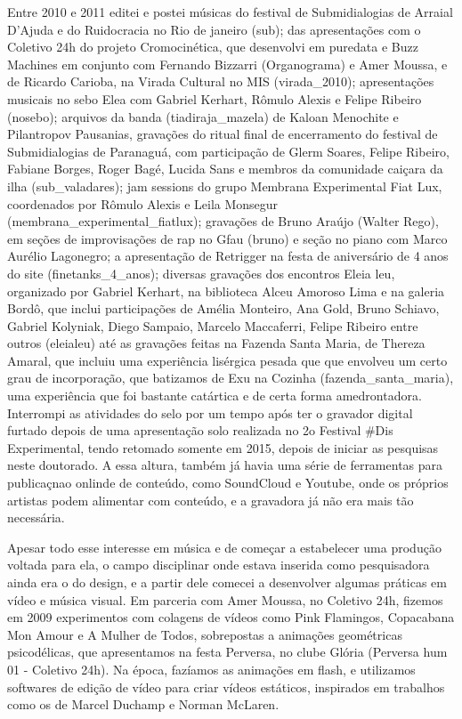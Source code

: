 Entre 2010 e 2011 editei e postei músicas do festival de Submidialogias de Arraial D'Ajuda e do Ruidocracia no Rio de janeiro (\/sub\/); das apresentações com o Coletivo 24h do projeto Cromocinética, que desenvolvi em puredata e Buzz Machines em conjunto com Fernando Bizzarri (Organograma) e Amer Moussa, e de Ricardo Carioba, na Virada Cultural no MIS (virada\_2010\/); apresentações musicais no sebo Elea com Gabriel Kerhart, Rômulo Alexis e Felipe Ribeiro (nosebo\/); arquivos da banda (tiadiraja\_mazela\/) de Kaloan Menochite e Pilantropov Pausanias, gravações do ritual final de encerramento do festival de Submidialogias de Paranaguá, com participação de Glerm Soares, Felipe Ribeiro, Fabiane Borges, Roger Bagé, Lucida Sans e membros da comunidade caiçara da ilha (\/sub\_valadares\/); jam sessions do grupo Membrana Experimental Fiat Lux, coordenados por Rômulo Alexis e Leila Monsegur (membrana\_experimental\_fiatlux\/); gravações de Bruno Araújo (Walter Rego), em seções de improvisações de rap no Gfau (bruno\/) e seção no piano com Marco Aurélio Lagonegro; a apresentação de Retrigger na festa de aniversário de 4 anos do site (finetanks\_4\_anos\/); diversas gravações dos encontros Eleia leu, organizado por Gabriel Kerhart, na biblioteca Alceu Amoroso Lima e na galeria Bordô, que inclui participações de Amélia Monteiro, Ana Gold, Bruno Schiavo, Gabriel Kolyniak, Diego Sampaio, Marcelo Maccaferri, Felipe Ribeiro entre outros (\/eleialeu\/) até as gravações feitas na Fazenda Santa Maria, de Thereza Amaral, que incluiu uma experiência lisérgica pesada que que envolveu um certo grau de incorporação, que batizamos de Exu na Cozinha (\/fazenda\_santa\_maria\/), uma experiência que foi bastante catártica e de certa forma amedrontadora. 
Interrompi as atividades do selo por um tempo após ter o gravador digital furtado depois de uma apresentação solo realizada no 2o Festival \#Dis Experimental, tendo retomado somente em 2015, depois de iniciar as pesquisas neste doutorado. A essa altura, também já havia uma série de ferramentas para publicaçnao onlinde de conteúdo, como SoundCloud e Youtube, onde os próprios artistas podem alimentar com conteúdo, e a gravadora já não era mais tão necessária.

Apesar todo esse interesse em música e de começar a estabelecer uma produção voltada para ela, o campo disciplinar onde estava inserida como pesquisadora ainda era o do design, e a partir dele comecei a desenvolver algumas práticas em vídeo e música visual. Em parceria com Amer Moussa, no Coletivo 24h, fizemos em 2009 experimentos com colagens de vídeos como Pink Flamingos, Copacabana Mon Amour e A Mulher de Todos, sobrepostas a animações geométricas psicodélicas, que apresentamos na festa Perversa, no clube Glória (Perversa hum 01 - Coletivo 24h). Na época, fazíamos as animações em flash, e utilizamos softwares de edição de vídeo para criar vídeos estáticos, inspirados em trabalhos como os de Marcel Duchamp e Norman McLaren. 

